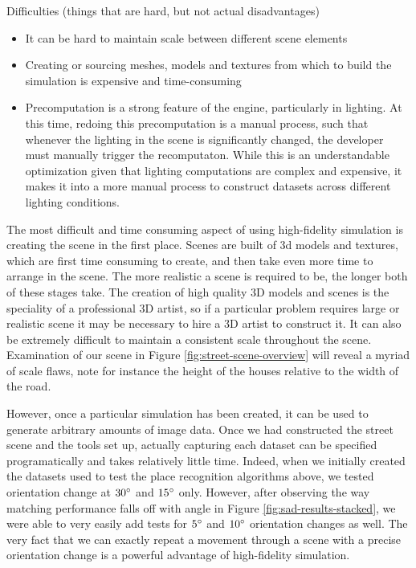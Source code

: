 \documentclass[letterpaper, 10 pt, conference]{ieeeconf}  %
\begin{document}
Difficulties (things that are hard, but not actual disadvantages)
\begin{itemize}
    \item It can be hard to maintain scale between different scene elements
    \item Creating or sourcing meshes, models and textures from which to build the simulation is expensive and time-consuming
    \item Precomputation is a strong feature of the engine, particularly in lighting. At this time, redoing this precomputation is a manual process, such that whenever the lighting in the scene is significantly changed, the developer must manually trigger the recomputaton. While this is an understandable optimization given that lighting computations are complex and expensive, it makes it into a more manual process to construct datasets across different lighting conditions.
\end{itemize}

The most difficult and time consuming aspect of using high-fidelity simulation is creating the scene in the first place. Scenes are built of 3d models and textures, which are first time consuming to create, and then take even more time to arrange in the scene. The more realistic a scene is required to be, the longer both of these stages take. The creation of high quality 3D models and scenes is the speciality of a professional 3D artist, so if a particular problem requires large or realistic scene it may be necessary to hire a 3D artist to construct it. It can also be extremely difficult to maintain a consistent scale throughout the scene. Examination of our scene in Figure \ref{fig:street-scene-overview} will reveal a myriad of scale flaws, note for instance the height of the houses relative to the width of the road.

However, once a particular simulation has been created, it can be used to generate arbitrary amounts of image data. Once we had constructed the street scene and the tools set up, actually capturing each dataset can be specified programatically and takes relatively little time. Indeed, when we initially created the  datasets used to test the place recognition algorithms above, we tested orientation change at $30\degree$ and $15\degree$ only. However, after observing the way matching performance falls off with angle in Figure \ref{fig:sad-results-stacked}, we were able to very easily add tests for $5\degree$ and $10\degree$ orientation changes as well. The very fact that we can exactly repeat a movement through a scene with a precise orientation change is a powerful advantage of high-fidelity simulation.
\end{document}
